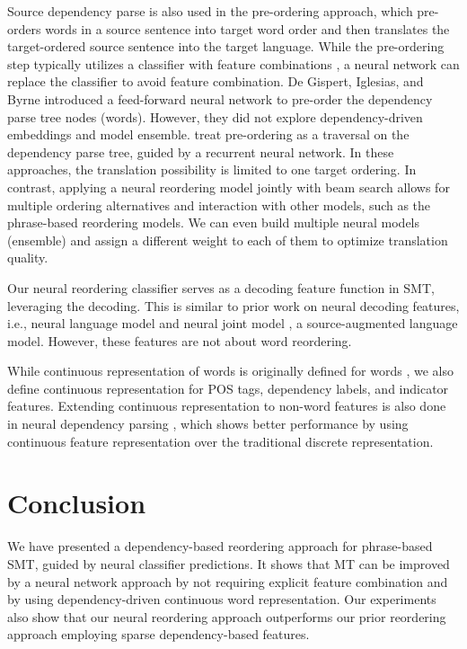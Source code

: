 \documentclass[letterpaper]{article}
\begin{document}
Source dependency parse is also used in the pre-ordering approach, which pre-orders words in a source sentence into target word order and then translates the target-ordered source sentence into the target language. While the pre-ordering step typically utilizes a classifier with feature combinations \cite{lerner_source-side_2013,jehl_source-side_2014}, a neural network can replace the classifier to avoid feature combination. De Gispert, Iglesias, and Byrne  introduced a feed-forward neural network to pre-order the dependency parse tree nodes (words). However, they did not explore dependency-driven embeddings and model ensemble. \citeauthor{miceli-barone_non-projective_2015}  treat pre-ordering as a traversal on the dependency parse tree, guided by a recurrent neural network. In these approaches, the translation possibility is limited to one target ordering. In contrast, applying a neural reordering model jointly with beam search allows for multiple ordering alternatives and interaction with other models, such as the phrase-based reordering models. We can even build multiple neural models (ensemble) and assign a different weight to each of them to optimize translation quality.

Our neural reordering classifier serves as a decoding feature function in SMT, leveraging the decoding. This is similar to prior work on neural decoding features, i.e., neural language model \cite{vaswani_decoding_2013} and neural joint model \cite{devlin_fast_2014}, a source-augmented language model. However, these features are not about word reordering.

While continuous representation of words is originally defined for words \cite{mikolov_efficient_2013}, we also define continuous representation for POS tags, dependency labels, and indicator features. Extending continuous representation to non-word features is also done in neural dependency parsing \cite{chen_fast_2014,andor_globally_2016}, which shows better performance by using continuous feature representation over the traditional discrete representation.

\section{Conclusion}

We have presented a dependency-based reordering approach for phrase-based SMT, guided by neural classifier predictions. It shows that MT can be improved by a neural network approach by not requiring explicit feature combination and by using dependency-driven continuous word representation. Our experiments also show that our neural reordering approach outperforms our prior reordering approach employing sparse dependency-based features.
\end{document}
